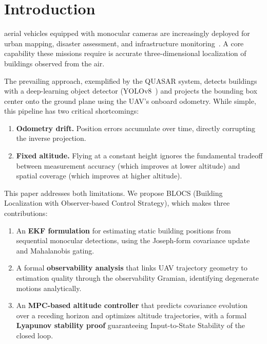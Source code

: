 \documentclass[journal]{IEEEtran}
\begin{document}
\section{Introduction}
 aerial vehicles equipped with monocular cameras are increasingly deployed for urban mapping, disaster assessment, and infrastructure monitoring~\cite{nex2014uav}.
A core capability these missions require is accurate three-dimensional localization of buildings observed from the air.

The prevailing approach, exemplified by the QUASAR system, detects buildings with a deep-learning object detector (YOLOv8~\cite{jocher2023yolov8}) and projects the bounding box center onto the ground plane using the UAV's onboard odometry.
While simple, this pipeline has two critical shortcomings:
\begin{enumerate}
    \item \textbf{Odometry drift.}  Position errors accumulate over time, directly corrupting the inverse projection.
    \item \textbf{Fixed altitude.}  Flying at a constant height ignores the fundamental tradeoff between measurement accuracy (which improves at lower altitude) and spatial coverage (which improves at higher altitude).
\end{enumerate}

This paper addresses both limitations.  We propose \textsc{BLOCS} (Building Localization with Observer-based Control Strategy), which makes three contributions:

\begin{enumerate}
    \item An \textbf{EKF formulation} for estimating static building positions from sequential monocular detections, using the Joseph-form covariance update and Mahalanobis gating.
    \item A formal \textbf{observability analysis} that links UAV trajectory geometry to estimation quality through the observability Gramian, identifying degenerate motions analytically.
    \item An \textbf{MPC-based altitude controller} that predicts covariance evolution over a receding horizon and optimizes altitude trajectories, with a formal \textbf{Lyapunov stability proof} guaranteeing Input-to-State Stability of the closed loop.
\end{enumerate}
\end{document}
